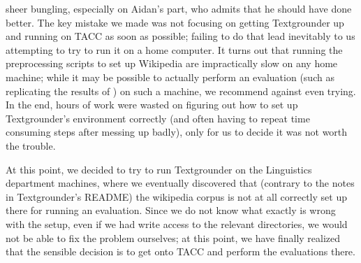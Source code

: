 sheer bungling, especially on Aidan's part, who admits that he should have done
better.
The key mistake we made was not focusing on getting Textgrounder up and running
on TACC as soon as possible; failing to do that lead inevitably to us
attempting to try to run it on a home computer.
It turns out that running the preprocessing scripts to set up Wikipedia are
impractically slow on any home machine; while it may be possible to actually
perform an evaluation (such as replicating the results of \cite{rolleretal:12})
on such a machine, we recommend against even trying.
In the end, hours of work were wasted on figuring out how to set up
Textgrounder's environment correctly (and often having to repeat time consuming
steps after messing up badly), only for us to decide it was not worth the trouble.
\par
At this point, we decided to try to run Textgrounder on the Linguistics
department machines, where we eventually discovered that (contrary to the notes
in Textgrounder's README) the wikipedia corpus is not at all correctly set up
there for running an evaluation.
Since we do not know what exactly is wrong with the setup, even if we had write
access to the relevant directories, we would not be able to fix the problem
ourselves; at this point, we have finally realized that the sensible decision
is to get onto TACC and perform the evaluations there.

